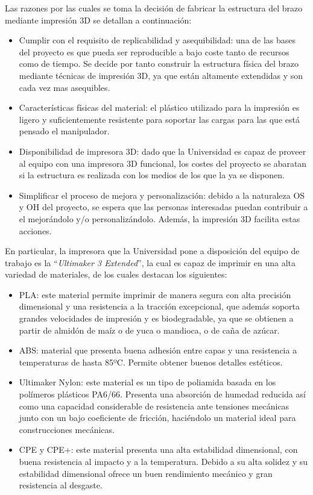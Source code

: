 Las razones por las cuales se toma la decisión de fabricar la estructura del brazo mediante impresión 3D se detallan a continuación:

\begin{itemize}
  \item Cumplir con el requisito de replicabilidad y asequibilidad: una de las bases del proyecto es que pueda ser reproducible a bajo coste tanto de recursos como de tiempo. Se decide por tanto construir la estructura física del brazo mediante técnicas de impresión 3D, ya que están altamente extendidas y son cada vez mas asequibles.
  
  \item Características físicas del material: el plástico utilizado para la impresión es ligero y suficientemente resistente para soportar las cargas para las que está pensado el manipulador.
  
  \item Disponibilidad de impresora 3D: dado que la Universidad es capaz de proveer al equipo con una impresora 3D funcional, los costes del proyecto se abaratan si la estructura es realizada con los medios de los que la ya se disponen.
  
  \item Simplificar el proceso de mejora y personalización: debido a la naturaleza \ac{OS} y \ac{OH} del proyecto, se espera que las personas interesadas puedan contribuir a el mejorándolo y/o personalizándolo. Además, la impresión 3D facilita estas acciones.
\end{itemize}

En particular, la impresora que la Universidad pone a disposición del equipo de trabajo es la ``\textit{Ultimaker 3 Extended}'', la cual es capaz de imprimir en una alta variedad de materiales, de los cuales destacan los siguientes:

\begin{itemize}
    \item \ac{PLA}\cite{noauthor_acido_2020}: este material permite imprimir de manera segura con alta precisión dimensional y una resistencia a la tracción excepcional, que además soporta grandes velocidades de impresión y es biodegradable, ya que se obtienen a partir de almidón de maíz o de yuca o mandioca, o de caña de azúcar. 
    \item \ac{ABS}\cite{noauthor_acrilonitrilo_2020}: material que presenta buena adhesión entre capas y una resistencia a temperaturas de hasta 85ºC. Permite obtener buenos detalles estéticos.
    \item Ultimaker Nylon: este material es un tipo de poliamida basada en los polímeros plásticos PA6/66. Presenta una absorción de humedad reducida así como una capacidad considerable de resistencia ante tensiones mecánicas junto con un bajo coeficiente de fricción, haciéndolo un material ideal para construcciones mecánicas.
    \item CPE y CPE+: este material presenta una alta estabilidad dimensional, con buena resistencia al impacto y a la temperatura. Debido a su alta solidez y su estabilidad dimensional ofrece un buen rendimiento mecánico y gran resistencia al desgaste.
\end{itemize}

